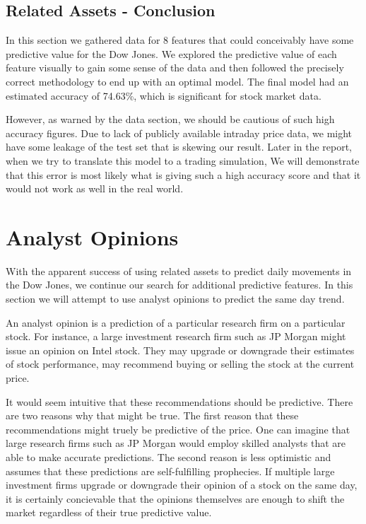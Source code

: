 \documentclass{report}
\begin{document}
\subsection{Related Assets - Conclusion}

In this section we gathered data for 8 features that could conceivably have some predictive value for the Dow Jones. We explored the predictive value of each feature visually to gain some sense of the data and then followed the precisely correct methodology to end up with an optimal model. The final model had an estimated accuracy of 74.63\%, which is significant for stock market data.

However, as warned by the data section, we should be cautious of such high accuracy figures. Due to lack of publicly available intraday price data, we might have some leakage of the test set that is skewing our result. Later in the report, when we try to translate this model to a trading simulation,  We will demonstrate that this error is most likely what is giving such a high accuracy score and that it would not work as well in the real world. 

\clearpage
\section{Analyst Opinions}

With the apparent success of using related assets to predict daily movements in the Dow Jones, we continue our search for additional predictive features. In this section we will attempt to use analyst opinions to predict the same day trend.

An analyst opinion is a prediction of a particular research firm on a particular stock. For instance, a large investment research firm such as JP Morgan might issue an opinion on Intel stock. They may upgrade or downgrade their estimates of stock performance, may recommend buying or selling the stock at the current price.

It would seem intuitive that these recommendations should be predictive. There are two reasons why that might be true. The first reason that these recommendations might truely be predictive of the price. One can imagine that large research firms such as JP Morgan would employ skilled analysts that are able to make accurate predictions. The second reason is less optimistic and assumes that these predictions are self-fulfilling prophecies. If multiple large investment firms upgrade or downgrade their opinion of a stock on the same day, it is certainly concievable that the opinions themselves are enough to shift the market regardless of their true predictive value.
\end{document}
